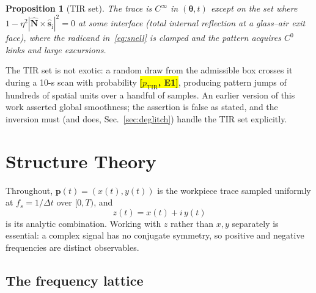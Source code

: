 \documentclass[twocolumn,preprintnumbers,amsmath,amssymb,pra,floatfix]{revtex4-2}
\newcommand{\vect}[1]{\bm{#1}}
\newcommand{\uvec}[1]{\hat{\bm{#1}}}
\newtheorem{proposition}{Proposition}
\newcommand{\PH}[1]{\colorbox{yellow}{\textbf{\small [#1]}}}
\begin{document}
\begin{proposition}[TIR set]
\label{prop:tir}
The trace is $C^\infty$ in $(\vect{\theta},t)$ except on the set where
$1-\eta^2|\uvec{N}\times\uvec{s}_\mathrm{i}|^2 = 0$ at some interface
(total internal reflection at a glass--air exit face), where the
radicand in~\eqref{eq:snell} is clamped and the pattern acquires
$C^0$ kinks and large excursions.
\end{proposition}

The TIR set is not exotic: a random draw from the admissible box
crosses it during a 10-s scan with probability
\PH{$p_{\mathrm{TIR}}$, E1}, producing pattern jumps of hundreds of
spatial units over a handful
of samples.  An earlier version of this work asserted global
smoothness; the assertion is false as stated, and the inversion must
(and does, Sec.~\ref{sec:deglitch}) handle the TIR set explicitly.

\section{Structure Theory}
\label{sec:theory}

Throughout, $\vect{p}(t)=(x(t),y(t))$ is the workpiece trace sampled
uniformly at $f_s=1/\Delta t$ over $[0,T)$, and
\begin{equation}
  z(t) = x(t) + i\,y(t)
\end{equation}
is its analytic combination.  Working with $z$ rather than $x,y$
separately is essential: a complex signal has no conjugate symmetry, so
positive and negative frequencies are distinct observables.

\subsection{The frequency lattice}
\end{document}
